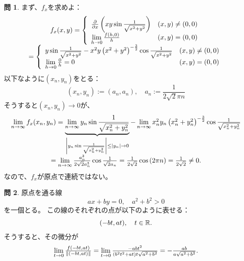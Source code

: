 \documentclass[12pt]{article} %
\theoremstyle{definition}
\newtheorem{question}{問}
\begin{document}
\begin{question}
	まず、$f_x$を求めよ：\begin{equation*}
		\begin{array}[]{c}
			f_x(x,y)=\left\{\begin{array}[]{ll}
				\frac{\partial}{\partial x}\left( xy\sin\frac{1}{\sqrt{x^2+y^2}} \right)&(x,y)\neq(0,0)\\
				\lim_{h\to0}\frac{f(h,0)}{h}&(x,y)=(0,0)
			\end{array}\right.\\
			=\left\{\begin{array}[]{ll}
				y\sin\frac{1}{\sqrt{x^2+y^2}}-x^2y\left( x^2+y^2 \right)^{-\frac{3}{2}}\cos\frac{1}{\sqrt{x^2+y^2}}&(x,y)\neq(0,0)\\
				\lim_{h\to0}\frac{0}{h}=0&(x,y)=(0,0)
			\end{array}\right.
		\end{array}
	\end{equation*}
		以下なように$(x_n,y_n)$をとる：
		\begin{equation*}
			(x_n,y_n):=\left( a_n,a_n \right),\quad a_n:=\frac{1}{2\sqrt{2}\pi n}
		\end{equation*}
		そうすると$(x_n,y_n)\to0$が、
		\begin{equation*}
			\begin{array}[]{c}
				\lim_{n\to\infty}f_x(x_n,y_n)=
				\underbrace{\lim_{n\to\infty}y_n\sin\frac{1}{\sqrt{x_n^2+y_n^2}}}_{\myabs{y_n\sin\frac{1}{\sqrt{x_n^2+y_n^2}}}\le\myabs{y_n}\to0}
				-\lim_{n\to\infty}x_n^2y_n\left( x_n^2+y_n^2 \right)^{-\frac{3}{2}}
				\cos\frac{1}{\sqrt{x_n^2+y_n^2}}\\
				=\lim_{n\to\infty}\frac{a_n^3}{2\sqrt{2}a_n^3}\cos\frac{1}{\sqrt{2}a_n}=\frac{1}{2\sqrt{2}}\cos\left( 2\pi n \right)=\frac{1}{2\sqrt{2}}\neq0.
			\end{array}
		\end{equation*}
		なので、$f_x$が原点で連続ではない。
\end{question}
\begin{question}
	原点を通る線
	\begin{equation*}
		ax+by=0,\quad a^2+b^2>0
	\end{equation*}
	を一個とる。
	この線のそれぞれの点が以下のように表せる：
	\begin{equation*}
		(-bt,at),\quad t\in\mathbb{R}.
	\end{equation*}
	そうすると、その微分が
	\begin{equation*}
		\begin{array}[]{c}
			\lim_{t\to0}\frac{f(-bt,at)}{\mynorm{(-bt,at)}}=\lim_{t\to0}\frac{-abt^2}{(b^2t^2+at)t\sqrt{a^2+b^2}}=-\frac{ab}{a\sqrt{a^2+b^2}}.
		\end{array}
	\end{equation*}
\end{question}
\end{document}
